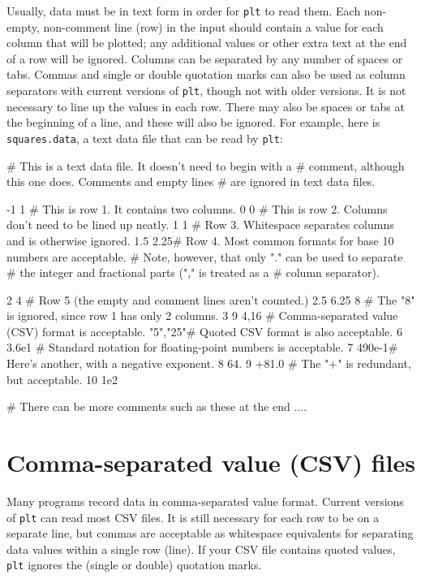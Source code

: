 \documentclass{book}
\begin{document}
Usually, data must be in text form in order for {\tt plt} to read them.
Each non-empty, non-comment line (row) in the input should contain a
value for each column that will be plotted; any additional
values or other extra text at the end of a row will be ignored.
Columns can be separated by any number of spaces or tabs.  Commas and
single or double quotation marks can also be used as column separators
with current versions of {\tt plt}, though not with older versions.
It is not necessary to line up the values in each row.  There may also
be spaces or tabs at the beginning of a line, and these will also be
ignored.  For example, here is {\tt squares.data}, a text data file
that can be read by {\tt plt}:

\begin{center}
\begin{boxedverbatim}
# This is a text data file.  It doesn't need to begin with a
# comment, although this one does.  Comments and empty lines
# are ignored in text data files.

-1 1	# This is row 1.  It contains two columns.
0    0	# This is row 2.  Columns don't need to be lined up neatly.
  1   1 # Row 3.  Whitespace separates columns and is otherwise ignored.
1.5 2.25# Row 4. Most common formats for base 10 numbers are acceptable.
	# Note, however, that only "." can be used to separate
	# the integer and fractional parts ("," is treated as a
	# column separator).

2 4	# Row 5 (the empty and comment lines aren't counted.)
2.5 6.25 8  # The "8" is ignored, since row 1 has only 2 columns.
3 9
4,16	# Comma-separated value (CSV) format is acceptable.
"5","25"# Quoted CSV format is also acceptable. 
6 3.6e1	# Standard notation for floating-point numbers is acceptable.
7 490e-1# Here's another, with a negative exponent.
8 64.
9 +81.0	# The "+" is redundant, but acceptable.
10 1e2

# There can be more comments such as these at the end ....
\end{boxedverbatim}
\end{center}

\section{Comma-separated value (CSV) files}

Many programs record data in comma-separated value format.  Current
versions of {\tt plt} can read most CSV files.  It is still necessary
for each row to be on a separate line, but commas are acceptable as
whitespace equivalents for separating data values within a single row
(line).  If your CSV file contains quoted values, {\tt plt} ignores
the (single or double) quotation marks.
\end{document}
